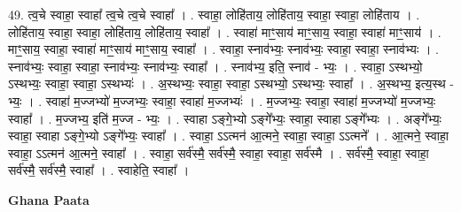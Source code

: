 \documentclass[17pt]{extarticle}
\begin{document}
49. त्व॒चे स्वाहा॒ स्वाहा᳚ त्व॒चे त्व॒चे स्वाहा᳚ । . स्वाहा॒ लोहि॑ताय॒ लोहि॑ताय॒ स्वाहा॒ स्वाहा॒ लोहि॑ताय । . लोहि॑ताय॒ स्वाहा॒ स्वाहा॒ लोहि॑ताय॒ लोहि॑ताय॒ स्वाहा᳚ । . स्वाहा॑ माꣳ॒॒साय॑ माꣳ॒॒साय॒ स्वाहा॒ स्वाहा॑ माꣳ॒॒साय॑ । . माꣳ॒॒साय॒ स्वाहा॒ स्वाहा॑ माꣳ॒॒साय॑ माꣳ॒॒साय॒ स्वाहा᳚ । . स्वाहा॒ स्नाव॑भ्यः॒ स्नाव॑भ्यः॒ स्वाहा॒ स्वाहा॒ स्नाव॑भ्यः । . स्नाव॑भ्यः॒ स्वाहा॒ स्वाहा॒ स्नाव॑भ्यः॒ स्नाव॑भ्यः॒ स्वाहा᳚ । . स्नाव॑भ्य॒ इति॒ स्नाव॑ - भ्यः॒ । . स्वाहा॒ ऽस्थभ्यो॒ ऽस्थभ्यः॒ स्वाहा॒ स्वाहा॒ ऽस्थभ्यः॑ । . अ॒स्थभ्यः॒ स्वाहा॒ स्वाहा॒ ऽस्थभ्यो॒ ऽस्थभ्यः॒ स्वाहा᳚ । . अ॒स्थभ्य॒ इत्य॒स्थ - भ्यः॒ । . स्वाहा॑ म॒ज्जभ्यो॑ म॒ज्जभ्यः॒ स्वाहा॒ स्वाहा॑ म॒ज्जभ्यः॑ । . म॒ज्जभ्यः॒ स्वाहा॒ स्वाहा॑ म॒ज्जभ्यो॑ म॒ज्जभ्यः॒ स्वाहा᳚ । . म॒ज्जभ्य॒ इति॑ म॒ज्ज - भ्यः॒ । . स्वाहा ऽङ्गे॒भ्यो ऽङ्गे᳚भ्यः॒ स्वाहा॒ स्वाहा ऽङ्गे᳚भ्यः । . अङ्गे᳚भ्यः॒ स्वाहा॒ स्वाहा ऽङ्गे॒भ्यो ऽङ्गे᳚भ्यः॒ स्वाहा᳚ । . स्वाहा॒ ऽऽत्मन॑ आ॒त्मने॒ स्वाहा॒ स्वाहा॒ ऽऽत्मने᳚ । . आ॒त्मने॒ स्वाहा॒ स्वाहा॒ ऽऽत्मन॑ आ॒त्मने॒ स्वाहा᳚ । . स्वाहा॒ सर्व॑स्मै॒ सर्व॑स्मै॒ स्वाहा॒ स्वाहा॒ सर्व॑स्मै । . सर्व॑स्मै॒ स्वाहा॒ स्वाहा॒ सर्व॑स्मै॒ सर्व॑स्मै॒ स्वाहा᳚ । . स्वाहेति॒ स्वाहा᳚ । \newline

\textbf{Ghana Paata } \newline
\end{document}
